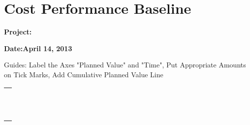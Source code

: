 \clearpage
\def \date {April 14, 2013}

\section {Cost Performance Baseline}
\textbf {Project: \projectName}

\textbf {Date:\date}

Guides: Label the Axes "Planned Value" and "Time", Put Appropriate Amounts on Tick Marks, Add Cumulative Planned Value Line

\begin {tabular} {|l|}
\\ \hline
\\ \hline
\\ \hline
\\ \hline
\\ \hline
\\ \hline
\\ \hline
\\ \hline
\\ \hline
\\ \hline
\\ \hline
\\ \hline
\\ \hline
\end {tabular}\\

